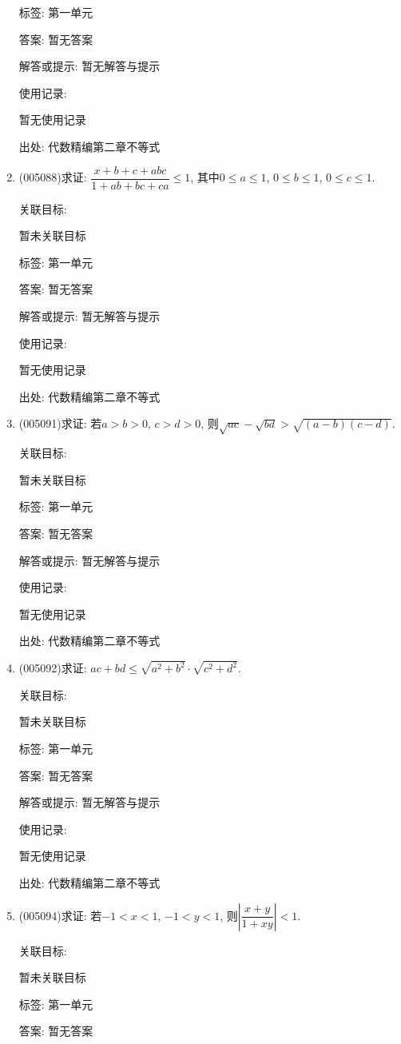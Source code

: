 \documentclass[10pt,a4paper]{article}
\begin{document}
\begin{enumerate}[1.]
标签: 第一单元

答案: 暂无答案

解答或提示: 暂无解答与提示

使用记录:

暂无使用记录


出处: 代数精编第二章不等式
\item { (005088)}求证: $\dfrac{x+b+c+abc}{1+ab+bc+ca}\le 1$, 其中$0\le a\le 1$, $0\le b\le 1$, $0\le c\le 1$.


关联目标:

暂未关联目标



标签: 第一单元

答案: 暂无答案

解答或提示: 暂无解答与提示

使用记录:

暂无使用记录


出处: 代数精编第二章不等式
\item { (005091)}求证: 若$a>b>0$, $c>d>0$, 则$\sqrt{ac}-\sqrt{bd}>\sqrt{(a-b)(c-d)}$.


关联目标:

暂未关联目标



标签: 第一单元

答案: 暂无答案

解答或提示: 暂无解答与提示

使用记录:

暂无使用记录


出处: 代数精编第二章不等式
\item { (005092)}求证: $ac+bd\le \sqrt{a^2+b^2}\cdot \sqrt{c^2+d^2}$.


关联目标:

暂未关联目标



标签: 第一单元

答案: 暂无答案

解答或提示: 暂无解答与提示

使用记录:

暂无使用记录


出处: 代数精编第二章不等式
\item { (005094)}求证: 若$-1<x<1$, $-1<y<1$, 则$|\dfrac{x+y}{1+xy}|<1$.


关联目标:

暂未关联目标



标签: 第一单元

答案: 暂无答案


\end{enumerate}
\end{document}
